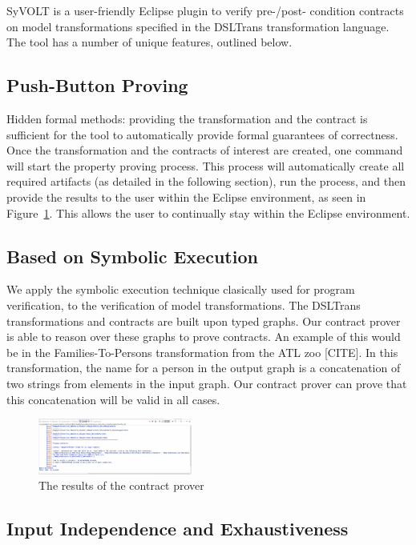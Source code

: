 SyVOLT is a user-friendly Eclipse plugin to verify pre-/post- condition
contracts on model transformations specified in the DSLTrans transformation
language. The tool has a number of unique features, outlined below.

\subsection{Push-Button Proving}
Hidden formal methods: providing the transformation and the contract is
sufficient for the tool to automatically provide formal guarantees of correctness. Once the transformation
and the contracts of interest are created, one command will start the property proving process. This process will automatically create
all required artifacts (as detailed in the following section), run the process,
and then provide the results to the user within the Eclipse environment, as seen
in Figure~\ref{fig:output}. This allows the user to continually stay within the
Eclipse environment.

\subsection{Based on Symbolic Execution}
We apply the symbolic execution technique clasically used for program
verification, to the verification of model transformations. The DSLTrans
transformations and contracts are built upon typed graphs.
Our contract prover is able to reason over these graphs to prove contracts. An
example of this would be in the Families-To-Persons transformation from the ATL
zoo [CITE]. In this transformation, the name for a person in the output graph is
a concatenation of two strings from elements in the input graph. Our contract
prover can prove that this concatenation will be valid in all cases.

\begin{figure}
\centering
\includegraphics[width=0.45\textwidth]{figures/output}
\caption{The results of the contract prover}
\label{fig:output}
\end{figure}

\subsection{Input Independence and Exhaustiveness}

